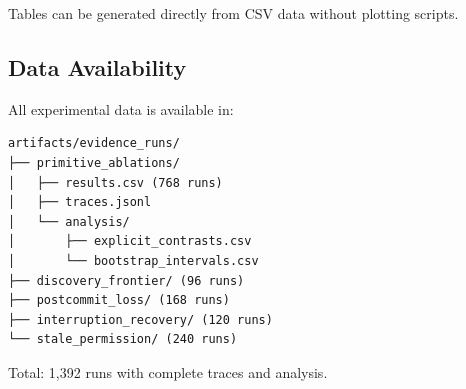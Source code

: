 Tables can be generated directly from CSV data without plotting scripts.

\subsection{Data Availability}

All experimental data is available in:
\begin{verbatim}
artifacts/evidence_runs/
├── primitive_ablations/
│   ├── results.csv (768 runs)
│   ├── traces.jsonl
│   └── analysis/
│       ├── explicit_contrasts.csv
│       └── bootstrap_intervals.csv
├── discovery_frontier/ (96 runs)
├── postcommit_loss/ (168 runs)
├── interruption_recovery/ (120 runs)
└── stale_permission/ (240 runs)
\end{verbatim}

Total: 1,392 runs with complete traces and analysis.

